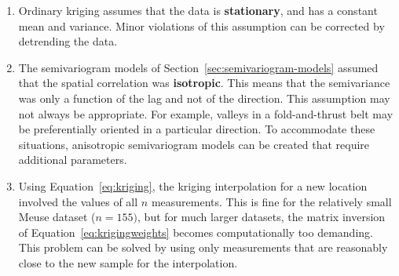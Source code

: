 \begin{enumerate}
\item Ordinary kriging assumes that the data is \textbf{stationary},
  and has a constant mean and variance. Minor violations of this
  assumption can be corrected by detrending the data.
\item The semivariogram models of
  Section~\ref{sec:semivariogram-models} assumed that the spatial
  correlation was \textbf{isotropic}. This means that the semivariance
  was only a function of the lag and not of the direction. This
  assumption may not always be appropriate. For example, valleys in a
  fold-and-thrust belt may be preferentially oriented in a particular
  direction. To accommodate these situations, anisotropic
  semivariogram models can be created that require additional
  parameters.
\item Using Equation~\ref{eq:kriging}, the kriging interpolation for a
  new location involved the values of all $n$ measurements.  This is
  fine for the relatively small Meuse dataset ($n=155)$, but for much
  larger datasets, the matrix inversion of
  Equation~\ref{eq:krigingweights} becomes computationally too
  demanding.  This problem can be solved by using only measurements
  that are reasonably close to the new sample for the interpolation.
\end{enumerate}

